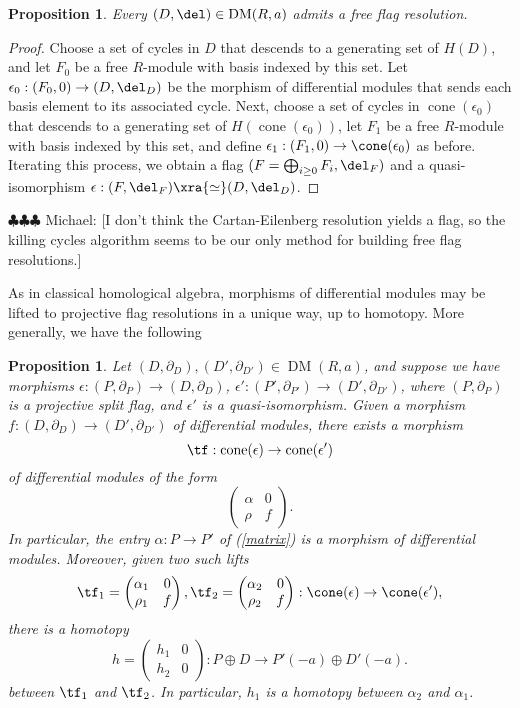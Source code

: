 \documentclass[12pt]{amsart}
\newtheorem{prop}[lemma]{Proposition}
\theoremstyle{definition}
\theoremstyle{remark}
\newcommand{\michael}[1]{{\color{red} \sf $\clubsuit\clubsuit\clubsuit$ Michael: [#1]}}
\def\on{\operatorname}
\def\a{\alpha}
\def\DM{\operatorname{DM}}
\begin{document}
\begin{prop}
\label{resexists}
Every $(D, \del) \in \DM(R, a)$ admits a free flag resolution.
\end{prop}

\begin{proof}
Choose a set of cycles in $D$ that descends to a generating set of $H(D)$, and let $F_0$ be a free $R$-module with basis indexed by this set. Let $\epsilon_0 : (F_0, 0) \to (D, \del_D)$ be the morphism of differential modules that sends each basis element to its associated cycle. Next, choose a set of cycles in $\on{cone}(\epsilon_0)$ that descends to a generating set of $H(\on{cone}(\epsilon_0))$, let $F_1$ be a free $R$-module with basis indexed by this set, and define $\epsilon_1 : (F_1, 0) \to \cone(\epsilon_0)$ as before. Iterating this process, we obtain a flag $(F = \bigoplus_{i \ge 0} F_i, \del_F)$ 
and a quasi-isomorphism $\epsilon : (F, \del_F) \xra{\simeq} (D, \del_D)$. 
\end{proof}
\michael{I don't think the Cartan-Eilenberg resolution yields a flag, so the killing cycles algorithm seems to be our only method for building free flag resolutions.}


As in classical homological algebra, morphisms of differential modules may be lifted to projective flag resolutions in a unique way, up to homotopy.  More generally, we have the following

\begin{prop}\label{prop:lifting}
Let $(D, \partial_D), (D', \partial_{D'}) \in \DM(R, a)$, and suppose we have morphisms $\epsilon : (P, \partial_P) \to (D, \partial_D)$, $\epsilon' : (P', \partial_{P'}) \to (D', \partial_{D'})$, where $(P, \partial_P)$ is a projective split flag, and $\epsilon'$ is a quasi-isomorphism. Given a morphism $f: (D, \partial_D) \to (D', \partial_{D'})$ of differential modules, there exists a morphism
$$
\tf:  \on{cone}(\epsilon) \to \on{cone}(\epsilon')
$$ 
of differential modules of the form 
\begin{equation}
\label{matrix}
\begin{pmatrix}
\alpha & 0  \\
\rho & f
\end{pmatrix}.
\end{equation}
In particular, the entry $\a: P \to P'$ of (\ref{matrix}) is a morphism of differential modules. Moreover, given two such lifts
$$
\tf_1 = \begin{pmatrix}
\alpha_1 & 0  \\
\rho_1 & f
\end{pmatrix}, 
\tf_2 = \begin{pmatrix}
\alpha_2 & 0  \\
\rho_2 & f
\end{pmatrix}
: \cone(\epsilon) \to \cone(\epsilon'),
$$
there is a homotopy 
$$
h = \begin{pmatrix} h_1 &0 \\ h_2 & 0 \end{pmatrix} : P \oplus D \to P'(-a) \oplus D'(-a).
$$
between $\tf_1$ and $\tf_2$. In particular, $h_1$ is a homotopy between $\a_2$ and $\a_1$.
\end{prop}
\end{document}
